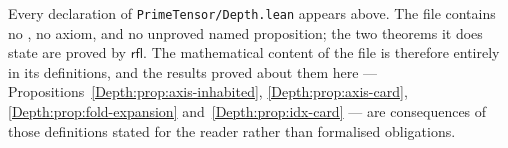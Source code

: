 \noindent
Every declaration of \texttt{PrimeTensor/Depth.lean} appears above.  The file
contains no , no axiom, and no unproved named proposition; the two
theorems it does state are proved by $\mathsf{rfl}$.  The mathematical content
of the file is therefore entirely in its definitions, and the results proved
about them here --- Propositions~\ref{Depth:prop:axis-inhabited},
\ref{Depth:prop:axis-card}, \ref{Depth:prop:fold-expansion} and~\ref{Depth:prop:idx-card} ---
are consequences of those definitions stated for the reader rather than
formalised obligations.

